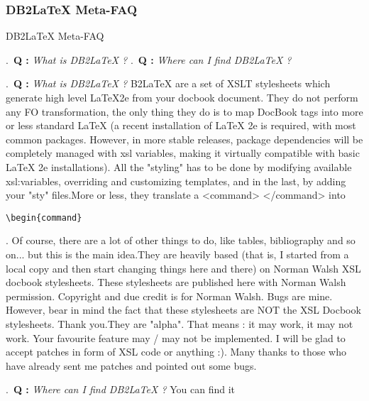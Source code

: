 \documentclass[pdftex,english,a4paper,10pt]{article}
\begin{document}
\subsubsection*{DB2LaTeX Meta-FAQ}
\label{id2720268}
\begin{qandadivtoc}
\caption{DB2LaTeX Meta-FAQ}
.~{\bf Q : }{\em What is DB2LaTeX ?} \newline
{}.~{\bf Q : }{\em Where can I find DB2LaTeX ?} \newline
\end{qandadivtoc}
\vspace{0.25cm}
.~{\bf Q : }{\em What is DB2LaTeX ?} \newline
{} B2LaTeX are a set of XSLT stylesheets which generate high level LaTeX2e from your docbook document. They do not perform any FO transformation, the only thing they do is to map DocBook tags into more or less standard LaTeX (a recent installation of LaTeX 2e is required, with most common packages. However, in more stable releases, package dependencies will be completely managed with xsl variables, making it virtually compatible with basic LaTeX 2e installations). All the "styling" has to be done by modifying available xsl:variables, overriding and customizing templates, and in the last, by adding your "sty" files.More or less, they translate a \textless{}command\textgreater{} \textless{}/command\textgreater{}  into 
\begin{Verbatim}[]
\begin{command}
\end{Verbatim}
. Of course, there are a lot of other things to do, like tables, bibliography and so on... but this is the main idea.They are heavily based (that is, I started from a local copy and then start changing things here and there) on Norman Walsh XSL docbook stylesheets. These stylesheets are published here with Norman Walsh permission. Copyright and due credit is for Norman Walsh. Bugs are mine. However, bear in mind the fact that these stylesheets are NOT the XSL Docbook stylesheets. Thank you.They are "alpha". That means : it may work, it may not work. Your favourite feature may / may not be implemented. I will be glad to accept patches in form of XSL code or anything :). Many thanks to those who have already sent me patches and pointed out some bugs.\newline
\vspace{0.25cm}


.~{\bf Q : }{\em Where can I find DB2LaTeX ?} \newline
{}You can find it \newline
\vspace{0.25cm}



\end{document}
